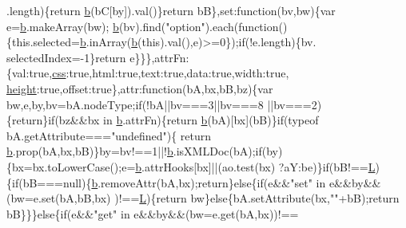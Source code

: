 \begin{DoxyCode}
      .length)\{\textcolor{keywordflow}{return} \hyperlink{jquery_8js_aa4026ad5544b958e54ce5e106fa1c805}{b}(bC[by]).val()\}\textcolor{keywordflow}{return} bB\},\textcolor{keyword}{set}:\textcolor{keyword}{function}(bv,bw)\{var e=\hyperlink{jquery_8js_aa4026ad5544b958e54ce5e106fa1c805}{b}.makeArray(bw);
      \hyperlink{jquery_8js_aa4026ad5544b958e54ce5e106fa1c805}{b}(bv).find(\textcolor{stringliteral}{"option"}).each(\textcolor{keyword}{function}()\{this.selected=\hyperlink{jquery_8js_aa4026ad5544b958e54ce5e106fa1c805}{b}.inArray(\hyperlink{jquery_8js_aa4026ad5544b958e54ce5e106fa1c805}{b}(\textcolor{keyword}{this}).val(),e)>=0\});\textcolor{keywordflow}{if}(!e.length)\{bv.
      selectedIndex=-1\}\textcolor{keywordflow}{return} e\}\}\},attrFn:\{val:\textcolor{keyword}{true},\hyperlink{jquery_8js_a89ad527fcd82c01ebb587332f5b4fcd4}{css}:\textcolor{keyword}{true},html:\textcolor{keyword}{true},text:\textcolor{keyword}{true},data:\textcolor{keyword}{true},width:\textcolor{keyword}{true},
      \hyperlink{styr_2styr_2main_8c_a48083b65ac9a863566dc3e3fff09a5b4}{height}:\textcolor{keyword}{true},offset:\textcolor{keyword}{true}\},attr:\textcolor{keyword}{function}(bA,bx,bB,bz)\{var bw,e,by,bv=bA.nodeType;\textcolor{keywordflow}{if}(!bA||bv===3||bv===8
      ||bv===2)\{\textcolor{keywordflow}{return}\}\textcolor{keywordflow}{if}(bz&&bx in \hyperlink{jquery_8js_aa4026ad5544b958e54ce5e106fa1c805}{b}.attrFn)\{\textcolor{keywordflow}{return} \hyperlink{jquery_8js_aa4026ad5544b958e54ce5e106fa1c805}{b}(bA)[bx](bB)\}\textcolor{keywordflow}{if}(typeof bA.getAttribute===\textcolor{stringliteral}{"undefined"})\{\textcolor{keywordflow}{
      return} \hyperlink{jquery_8js_aa4026ad5544b958e54ce5e106fa1c805}{b}.prop(bA,bx,bB)\}by=bv!==1||!\hyperlink{jquery_8js_aa4026ad5544b958e54ce5e106fa1c805}{b}.isXMLDoc(bA);\textcolor{keywordflow}{if}(by)\{bx=bx.toLowerCase();e=\hyperlink{jquery_8js_aa4026ad5544b958e54ce5e106fa1c805}{b}.attrHooks[bx]||(ao.test(bx)
      ?aY:be)\}\textcolor{keywordflow}{if}(bB!==\hyperlink{jquery_8js_a38ee4c0b5f4fe2a18d0c783af540d253}{L})\{\textcolor{keywordflow}{if}(bB===null)\{\hyperlink{jquery_8js_aa4026ad5544b958e54ce5e106fa1c805}{b}.removeAttr(bA,bx);\textcolor{keywordflow}{return}\}\textcolor{keywordflow}{else}\{\textcolor{keywordflow}{if}(e&&\textcolor{stringliteral}{"set"} in e&&by&&(bw=e.set(bA,bB,bx)
      )!==\hyperlink{jquery_8js_a38ee4c0b5f4fe2a18d0c783af540d253}{L})\{\textcolor{keywordflow}{return} bw\}\textcolor{keywordflow}{else}\{bA.setAttribute(bx,\textcolor{stringliteral}{""}+bB);\textcolor{keywordflow}{return} bB\}\}\}\textcolor{keywordflow}{else}\{\textcolor{keywordflow}{if}(e&&\textcolor{stringliteral}{"get"} in e&&by&&(bw=e.get(bA,bx))!==

\end{DoxyCode}
